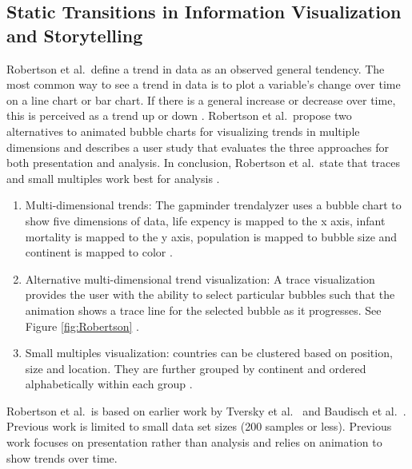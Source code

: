 \documentclass{egpubl}
\begin{document}
\subsection{Static Transitions in Information Visualization and Storytelling}
Robertson et al.\ define a trend in data as an observed general tendency. The most common way to see a trend in data is to plot a variable's change over time on a line chart or bar chart. If there is a general increase or decrease over time, this is perceived as a trend up or down \cite{Rebortson}.
Robertson et al.\ propose two alternatives to animated bubble charts for visualizing trends in multiple dimensions and describes a user study that evaluates the three approaches for both presentation and analysis. In conclusion, Robertson et al.\ state that traces and small multiples work best for analysis \cite{Rebortson}.
\begin{enumerate}
\item Multi-dimensional trends: The gapminder trendalyzer uses a bubble chart to show five dimensions of data, life expency is mapped to the x axis, infant mortality is mapped to the y axis, population is mapped to bubble size and continent is mapped to color \cite{ted1}.
\item Alternative multi-dimensional trend visualization: A trace visualization provides the user with the ability to select particular bubbles such that the animation shows a trace line for the selected bubble as it progresses. See Figure \ref{fig:Robertson} \cite{ted2}.
\item Small multiples visualization: countries can be clustered based on position, size and location. They are further grouped by continent and ordered alphabetically within each group \cite{Tufte}.
\end{enumerate}
Robertson et al.\ is based on earlier work by Tversky et al.\ \cite{tversky} and Baudisch et al.\ \cite{baudisch}. Previous work is limited to small data set sizes (200 samples or less). Previous work focuses on presentation rather than analysis and relies on animation to show trends over time.
\end{document}
